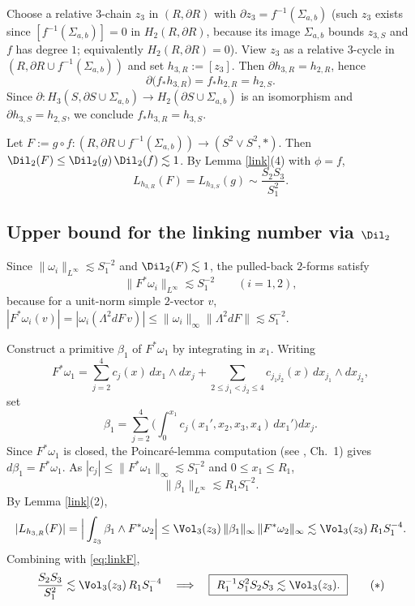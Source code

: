 Choose a relative $3$-chain $z_3$ in $(R,\partial R)$ with $\partial z_3=f^{-1}(\Sigma_{a,b})$ (such $z_3$ exists since $[f^{-1}(\Sigma_{a,b})]=0$ in $H_2(R,\partial R)$, because its image $\Sigma_{a,b}$ bounds $z_{3,S}$ and $f$ has degree $1$; equivalently $H_2(R,\partial R)=0$). View $z_3$ as a relative $3$-cycle in $(R,\partial R\cup f^{-1}(\Sigma_{a,b}))$ and set $h_{3,R}:=[z_3]$. Then $\partial h_{3,R}=h_{2,R}$, hence
\[
\partial\big(f_*h_{3,R}\big)=f_*h_{2,R}=h_{2,S}.
\]
Since $\partial:H_3(S,\partial S\cup\Sigma_{a,b})\to H_2(\partial S\cup\Sigma_{a,b})$ is an isomorphism and $\partial h_{3,S}=h_{2,S}$, we conclude $f_*h_{3,R}=h_{3,S}$.

Let $F:=g\circ f:(R,\partial R\cup f^{-1}(\Sigma_{a,b}))\to(S^2\vee S^2,*)$. Then $\Dil_2(F)\le\Dil_2(g)\,\Dil_2(f)\lesssim1$. By Lemma \ref{link}(4) with $\phi=f$,
\begin{equation}\label{eq:linkF}
L_{h_{3,R}}(F)=L_{h_{3,S}}(g)\sim\frac{S_2S_3}{S_1^2}.
\end{equation}

\subsection*{Upper bound for the linking number via $\Dil_2$}
Since $\|\omega_i\|_{L^\infty}\lesssim S_1^{-2}$ and $\Dil_2(F)\lesssim1$, the pulled-back $2$-forms satisfy
\[
\|F^*\omega_i\|_{L^\infty}\lesssim S_1^{-2}\qquad(i=1,2),
\]
because for a unit-norm simple $2$-vector $v$, $|F^*\omega_i(v)|=|\omega_i(\Lambda^2dF\,v)|\le\|\omega_i\|_\infty\|\Lambda^2dF\|\lesssim S_1^{-2}$.

Construct a primitive $\beta_1$ of $F^*\omega_1$ by integrating in $x_1$. Writing
\[
F^*\omega_1=\sum_{j=2}^4 c_j(x)\,dx_1\wedge dx_j+\sum_{2\le j_1<j_2\le4}c_{j_1j_2}(x)\,dx_{j_1}\wedge dx_{j_2},
\]
set
\[
\beta_1=\sum_{j=2}^4\Big(\int_0^{x_1}c_j(x_1',x_2,x_3,x_4)\,dx_1'\Big)dx_j .
\]
Since $F^*\omega_1$ is closed, the Poincaré-lemma computation (see \cite{BT}, Ch.\ 1) gives $d\beta_1=F^*\omega_1$. As $|c_j|\le\|F^*\omega_1\|_\infty\lesssim S_1^{-2}$ and $0\le x_1\le R_1$,
\[
\|\beta_1\|_{L^\infty}\lesssim R_1S_1^{-2}.
\]
By Lemma \ref{link}(2),
\[
|L_{h_{3,R}}(F)|=\Big|\int_{z_3}\beta_1\wedge F^*\omega_2\Big|\le \Vol_3(z_3)\,\|\beta_1\|_\infty\,\|F^*\omega_2\|_\infty\lesssim \Vol_3(z_3)\,R_1S_1^{-4}.
\]
Combining with \eqref{eq:linkF},
\[
\frac{S_2S_3}{S_1^2}\lesssim \Vol_3(z_3)\,R_1S_1^{-4}\quad\Longrightarrow\quad
\boxed{\ R_1^{-1}S_1^2S_2S_3\lesssim \Vol_3(z_3).\ }
\tag{$\ast$}
\]

